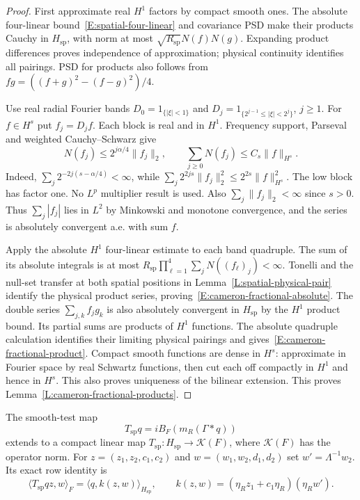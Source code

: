 \begin{proof}
  First approximate real $H^1$ factors by compact smooth ones.
  The absolute four-linear bound~\eqref{E:spatial-four-linear} and
  covariance PSD make their products Cauchy in $H_{\mathrm{sp}}$,
  with norm at most $\sqrt{R_{\mathrm{sp}}}N(f)N(g)$.
  Expanding product differences proves independence of approximation;
  physical continuity identifies all pairings. PSD for products also
  follows from $fg=((f+g)^2-(f-g)^2)/4$.

  Use real radial Fourier bands $D_0=1_{\{|\xi|<1\}}$ and
  $D_j=1_{\{2^{j-1}\le|\xi|<2^j\}}$, $j\ge1$.
  For $f\in H^s$ put $f_j=D_jf$. Each block is real and in $H^1$.
  Frequency support, Parseval and weighted Cauchy--Schwarz give
  \begin{equation}\label{E:cameron-dyadic-product}
    N(f_j)\le2^{j\alpha/4}\|f_j\|_2,\qquad
    \sum_{j\ge0}N(f_j)\le C_s\|f\|_{H^s}.
  \end{equation}
  Indeed, $\sum_j2^{-2j(s-\alpha/4)}<\infty$, while
  $\sum_j2^{2js}\|f_j\|_2^2\le2^{2s}\|f\|_{H^s}^2$.
  The low block has factor one. No $L^p$ multiplier result is used.
  Also $\sum_j\|f_j\|_2<\infty$ since $s>0$.
  Thus $\sum_j|f_j|$ lies in $L^2$ by Minkowski and monotone
  convergence, and the series is absolutely convergent a.e. with sum $f$.

  Apply the absolute $H^1$ four-linear estimate to each band
  quadruple. The sum of its absolute integrals is at most
  $R_{\mathrm{sp}}\prod_{\ell=1}^4\sum_jN((f_\ell)_j)<\infty$.
  Tonelli and the null-set transfer at both spatial positions in
  Lemma~\ref{L:spatial-physical-pair} identify the physical product
  series, proving~\eqref{E:cameron-fractional-absolute}.
  The double series $\sum_{j,k}f_jg_k$ is also absolutely convergent
  in $H_{\mathrm{sp}}$ by the $H^1$ product bound.
  Its partial sums are products of $H^1$ functions. The absolute
  quadruple calculation identifies their limiting physical pairings
  and gives~\eqref{E:cameron-fractional-product}.
  Compact smooth functions are dense in $H^s$: approximate in
  Fourier space by real Schwartz functions, then cut each off
  compactly in $H^1$ and hence in $H^s$.
  This also proves uniqueness of the bilinear extension.
  This proves Lemma~\ref{L:cameron-fractional-products}.
\end{proof}

\begin{proposition}\label{P:cameron-spatial-map}
  The smooth-test map
  \[
    T_{\mathrm{sp}}q=iB_F(m_R(\Gamma*q))
  \]
  extends to a compact linear map
  $T_{\mathrm{sp}}:H_{\mathrm{sp}}\to\mathcal K(F)$, where
  $\mathcal K(F)$ has the operator norm.
  For $z=(z_1,z_2,c_1,c_2)$ and $w=(w_1,w_2,d_1,d_2)$ set
  $w'=\Lambda^{-1}w_2$. Its exact row identity is
  \begin{equation}\label{E:cameron-spatial-row}
    \langle T_{\mathrm{sp}}qz,w\rangle_F
    =\langle q,k(z,w)\rangle_{H_{\mathrm{sp}}},
    \qquad
    k(z,w)=(\eta_Rz_1+c_1\eta_R)(\eta_Rw').
  \end{equation}
\end{proposition}

